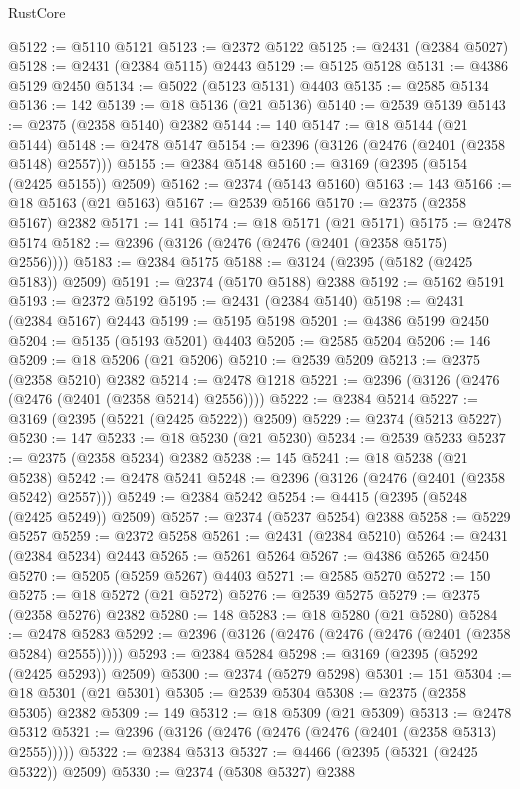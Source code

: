 \begin{lexlean}{RustCore}
\begin{coremodule}
@5122 := @5110 @5121
@5123 := @2372 @5122
@5125 := @2431 (@2384 @5027)
@5128 := @2431 (@2384 @5115) @2443
@5129 := @5125 @5128
@5131 := @4386 @5129 @2450
@5134 := @5022 (@5123 @5131) @4403
@5135 := @2585 @5134
@5136 := 142
@5139 := @18 @5136 (@21 @5136)
@5140 := @2539 @5139
@5143 := @2375 (@2358 @5140) @2382
@5144 := 140
@5147 := @18 @5144 (@21 @5144)
@5148 := @2478 @5147
@5154 := @2396 (@3126 (@2476 (@2401 (@2358 @5148) @2557)))
@5155 := @2384 @5148
@5160 := @3169 (@2395 (@5154 (@2425 @5155)) @2509)
@5162 := @2374 (@5143 @5160)
@5163 := 143
@5166 := @18 @5163 (@21 @5163)
@5167 := @2539 @5166
@5170 := @2375 (@2358 @5167) @2382
@5171 := 141
@5174 := @18 @5171 (@21 @5171)
@5175 := @2478 @5174
@5182 := @2396 (@3126 (@2476 (@2476 (@2401 (@2358 @5175) @2556))))
@5183 := @2384 @5175
@5188 := @3124 (@2395 (@5182 (@2425 @5183)) @2509)
@5191 := @2374 (@5170 @5188) @2388
@5192 := @5162 @5191
@5193 := @2372 @5192
@5195 := @2431 (@2384 @5140)
@5198 := @2431 (@2384 @5167) @2443
@5199 := @5195 @5198
@5201 := @4386 @5199 @2450
@5204 := @5135 (@5193 @5201) @4403
@5205 := @2585 @5204
@5206 := 146
@5209 := @18 @5206 (@21 @5206)
@5210 := @2539 @5209
@5213 := @2375 (@2358 @5210) @2382
@5214 := @2478 @1218
@5221 := @2396 (@3126 (@2476 (@2476 (@2401 (@2358 @5214) @2556))))
@5222 := @2384 @5214
@5227 := @3169 (@2395 (@5221 (@2425 @5222)) @2509)
@5229 := @2374 (@5213 @5227)
@5230 := 147
@5233 := @18 @5230 (@21 @5230)
@5234 := @2539 @5233
@5237 := @2375 (@2358 @5234) @2382
@5238 := 145
@5241 := @18 @5238 (@21 @5238)
@5242 := @2478 @5241
@5248 := @2396 (@3126 (@2476 (@2401 (@2358 @5242) @2557)))
@5249 := @2384 @5242
@5254 := @4415 (@2395 (@5248 (@2425 @5249)) @2509)
@5257 := @2374 (@5237 @5254) @2388
@5258 := @5229 @5257
@5259 := @2372 @5258
@5261 := @2431 (@2384 @5210)
@5264 := @2431 (@2384 @5234) @2443
@5265 := @5261 @5264
@5267 := @4386 @5265 @2450
@5270 := @5205 (@5259 @5267) @4403
@5271 := @2585 @5270
@5272 := 150
@5275 := @18 @5272 (@21 @5272)
@5276 := @2539 @5275
@5279 := @2375 (@2358 @5276) @2382
@5280 := 148
@5283 := @18 @5280 (@21 @5280)
@5284 := @2478 @5283
@5292 := @2396 (@3126 (@2476 (@2476 (@2476 (@2401 (@2358 @5284) @2555)))))
@5293 := @2384 @5284
@5298 := @3169 (@2395 (@5292 (@2425 @5293)) @2509)
@5300 := @2374 (@5279 @5298)
@5301 := 151
@5304 := @18 @5301 (@21 @5301)
@5305 := @2539 @5304
@5308 := @2375 (@2358 @5305) @2382
@5309 := 149
@5312 := @18 @5309 (@21 @5309)
@5313 := @2478 @5312
@5321 := @2396 (@3126 (@2476 (@2476 (@2476 (@2401 (@2358 @5313) @2555)))))
@5322 := @2384 @5313
@5327 := @4466 (@2395 (@5321 (@2425 @5322)) @2509)
@5330 := @2374 (@5308 @5327) @2388

\end{coremodule}
\end{lexlean}
